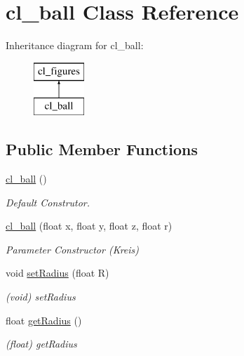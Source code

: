 \hypertarget{classcl__ball}{}\section{cl\+\_\+ball Class Reference}
\label{classcl__ball}
Inheritance diagram for cl\+\_\+ball\+:\begin{figure}[H]
\begin{center}
\leavevmode
\includegraphics[height=2.000000cm]{classcl__ball}
\end{center}
\end{figure}
\subsection*{Public Member Functions}
{\bf }\par
\begin{DoxyCompactItemize}
\item 
\hyperlink{classcl__ball_a097ce75b4ce4af7534abe10aa71bf918}{cl\+\_\+ball} ()
\begin{DoxyCompactList}\small\item\em Default Construtor. \end{DoxyCompactList}\item 
\hyperlink{classcl__ball_aa98bdf4ffd4ac3cb35b84686234c6a2e}{cl\+\_\+ball} (float x, float y, float z, float r)
\begin{DoxyCompactList}\small\item\em Parameter Constructor (Kreis) \end{DoxyCompactList}\end{DoxyCompactItemize}

{\bf }\par
\begin{DoxyCompactItemize}
\item 
void \hyperlink{classcl__ball_a6d13f50c176344c4b199b11a52737866}{set\+Radius} (float R)
\begin{DoxyCompactList}\small\item\em (void) set\+Radius \end{DoxyCompactList}\item 
float \hyperlink{classcl__ball_a6c2ec7629e03361ec6e4676e560cf5a8}{get\+Radius} ()
\begin{DoxyCompactList}\small\item\em (float) get\+Radius \end{DoxyCompactList}\end{DoxyCompactItemize}

